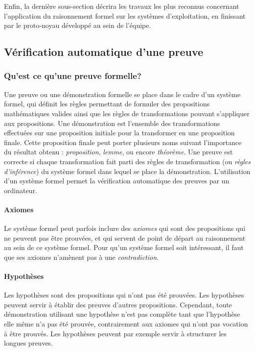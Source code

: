 	Enfin, la dernière sous-section décrira les travaux les plus reconnus concernant l'application du raisonnement formel sur les systèmes d'exploitation, en finissant par le proto-noyau développé au sein de l'équipe.

		\subsection{Vérification automatique d'une preuve}

			\subsubsection{Qu'est ce qu'une preuve formelle?}
			Une preuve ou une démonstration formelle se place dans le cadre d'un système formel, qui définit les règles permettant de formuler des propositions mathématiques valides ainsi que les règles de transformations pouvant s'appliquer aux propositions. Une démonstration est l'ensemble des transformations effectuées sur une proposition initiale pour la transformer en une proposition finale. Cette proposition finale peut porter plusieurs noms suivant l'importance du résultat obtenu : \emph{proposition}, \emph{lemme}, ou encore \emph{théorème}. Une preuve est correcte si chaque transformation fait parti des règles de transformation (ou \emph{règles d'inférence}) du système formel dans lequel se place la démonstration. L'utilisation d'un système formel permet la vérification automatique des preuves par un ordinateur.

			\paragraph{Axiomes} Le système formel peut parfois inclure des \emph{axiomes} qui sont des propositions qui ne peuvent pas être prouvées, et qui servent de point de départ au raisonnement au sein de ce système formel. Pour qu'un système formel soit intéressant, il faut que ses axiomes n'amènent pas à une \emph{contradiction}.

			\paragraph{Hypothèses} Les hypothèses sont des propositions qui n'ont pas été prouvées. Les hypothèses peuvent servir à établir des preuves d'autres propositions. Cependant, toute démonstration utilisant une hypothèse n'est pas complète tant que l'hypothèse elle même n'a pas été prouvée, contrairement aux axiomes qui n'ont pas vocation à être prouvés. Les hypothèses peuvent par exemple servir à structurer les longues preuves.

